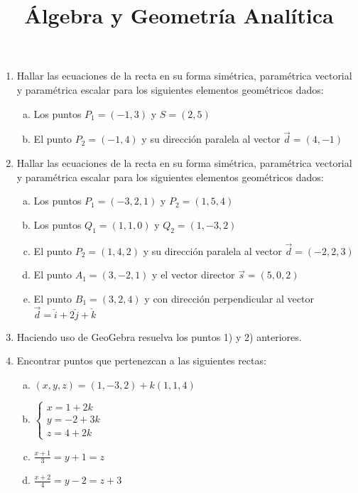 \documentclass[11pt,a4paper]{article}
\title{\'Algebra y Geometr\'ia Anal\'itica} %
\date{}
\begin{document}

\maketitle %

\begin{enumerate}
\setcounter{enumi}{0} %

\item Hallar las ecuaciones de la recta en su forma sim\'etrica, param\'etrica vectorial y param\'etrica escalar para los siguientes elementos geom\'etricos dados:

\begin{enumerate}[a)]
\item Los puntos $P_{1} = (-1, 3)$ y $S = (2, 5)$
\item El punto $P_{2} = (-1, 4)$ y su direcci\'on paralela al vector $\vec{d} = (4, -1)$
\end{enumerate}

\item Hallar las ecuaciones de la recta en su forma sim\'etrica, param\'etrica vectorial y param\'etrica escalar para los siguientes elementos geom\'etricos dados:

\begin{enumerate}[a)]
\item Los puntos $P_{1} = (-3, 2, 1)$ y $P_{2} = (1, 5, 4)$
\item Los puntos $Q_{1} = (1, 1, 0)$ y $Q_{2} = (1, -3, 2)$
\item El punto $P_{2} = (1, 4, 2)$ y su direcci\'on paralela al vector \linebreak $\vec{d} = (-2, 2, 3)$
\item El punto $A_{1} = (3, -2, 1)$ y el vector director $\vec{s} = (5, 0, 2)$
\item El punto $B_{1} = (3, 2, 4)$ y con direcci\'on perpendicular al vector $\vec{d} = \check{i} + 2 \check{j} + \check{k}$
\end{enumerate}

\item Haciendo uso de GeoGebra resuelva los puntos 1) y 2) anteriores.

\item Encontrar puntos que pertenezcan a las siguientes rectas:

\begin{enumerate}[a)]
\item $(x, y, z) = (1, -3, 2) + k (1, 1, 4)$
\item $\begin{cases}
  x = 1 + 2k \\
  y = -2 + 3k \\
  z = 4 + 2k
\end{cases}$
\item $\frac{x + 1}{3} = y + 1 = z$
\item $\frac{x + 2}{4} = y - 2 = z + 3$
\end{enumerate}


\end{enumerate}
\end{document}
